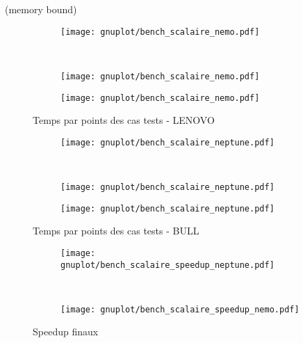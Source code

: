 (memory bound)



\begin{figure}[h!]
  \centering
  \begin{subfigure}[b]{0.5\textwidth}
    \centering
    \texttt{[image: gnuplot/bench\_scalaire\_nemo.pdf]}
  \caption{\label{fig:bench_scal_nemo_nonper}}
  \end{subfigure}%
  ~
  \begin{subfigure}[b]{0.5\textwidth}
    \centering
    \texttt{[image: gnuplot/bench\_scalaire\_nemo.pdf]}
  \caption{\label{fig:bench_scal_nemo_sym}}
  \end{subfigure}
  \begin{subfigure}[b]{0.5\textwidth}
    \centering
    \texttt{[image: gnuplot/bench\_scalaire\_nemo.pdf]}
  \caption{\label{fig:bench_scal_nemo_per}}
  \end{subfigure}
  \caption{\label{fig:bench_scal_nemo}Temps par points des cas tests - LENOVO}
\end{figure}


\begin{figure}[h!]
  \centering
  \begin{subfigure}[b]{0.5\textwidth}
    \centering
    \texttt{[image: gnuplot/bench\_scalaire\_neptune.pdf]}
  \caption{\label{fig:bench_scal_neptune_nonper}}
  \end{subfigure}%
  ~
  \begin{subfigure}[b]{0.5\textwidth}
    \centering
    \texttt{[image: gnuplot/bench\_scalaire\_neptune.pdf]}
  \caption{\label{fig:bench_scal_neptune_sym}}
  \end{subfigure}
  \begin{subfigure}[b]{0.5\textwidth}
    \centering
    \texttt{[image: gnuplot/bench\_scalaire\_neptune.pdf]}
  \caption{\label{fig:bench_scal_neptune_per}}
  \end{subfigure}
  \caption{\label{fig:bench_scal_neptune}Temps par points des cas tests - BULL}
\end{figure}


\begin{figure}[h!]
  \centering
  \begin{subfigure}[b]{0.5\textwidth}
    \centering
    \texttt{[image: gnuplot/bench\_scalaire\_speedup\_neptune.pdf]}
  \caption{\label{fig:bench_scal_neptune_speedup}}
  \end{subfigure}%
  ~
  \begin{subfigure}[b]{0.5\textwidth}
    \centering
    \texttt{[image: gnuplot/bench\_scalaire\_speedup\_nemo.pdf]}
  \caption{\label{fig:bench_scal_nemo_speedup}}
  \end{subfigure}
  \caption{\label{fig:bench_scal_speedups}Speedup finaux}
\end{figure}


